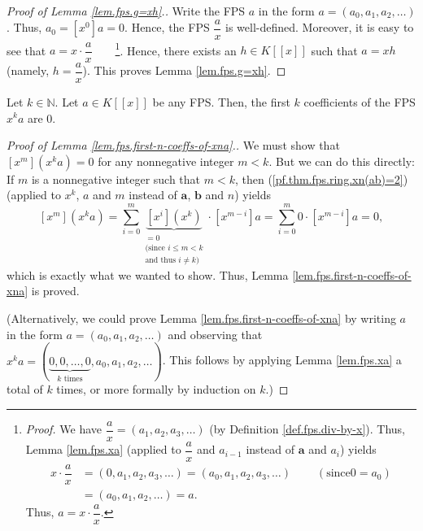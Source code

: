 \begin{proof}
[Proof of Lemma \ref{lem.fps.g=xh}.]Write the FPS $a$ in the form $a=\left(
a_{0},a_{1},a_{2},\ldots\right)  $. Thus, $a_{0}=\left[  x^{0}\right]  a=0$.
Hence, the FPS $\dfrac{a}{x}$ is well-defined. Moreover, it is easy to see
that $a=x\cdot\dfrac{a}{x}$\ \ \ \ \footnote{\textit{Proof.} We have
$\dfrac{a}{x}=\left(  a_{1},a_{2},a_{3},\ldots\right)  $ (by Definition
\ref{def.fps.div-by-x}). Thus, Lemma \ref{lem.fps.xa} (applied to $\dfrac
{a}{x}$ and $a_{i-1}$ instead of $\mathbf{a}$ and $a_{i}$) yields%
\begin{align*}
x\cdot\dfrac{a}{x}  &  =\left(  0,a_{1},a_{2},a_{3},\ldots\right)  =\left(
a_{0},a_{1},a_{2},a_{3},\ldots\right)  \ \ \ \ \ \ \ \ \ \ \left(  \text{since
}0=a_{0}\right) \\
&  =\left(  a_{0},a_{1},a_{2},\ldots\right)  =a.
\end{align*}
Thus, $a=x\cdot\dfrac{a}{x}$.}. Hence, there exists an $h\in K\left[  \left[
x\right]  \right]  $ such that $a=xh$ (namely, $h=\dfrac{a}{x}$). This proves
Lemma \ref{lem.fps.g=xh}.
\end{proof}

\begin{lemma}
\label{lem.fps.first-n-coeffs-of-xna}Let $k\in\mathbb{N}$. Let $a\in K\left[
\left[  x\right]  \right]  $ be any FPS. Then, the first $k$ coefficients of
the FPS $x^{k}a$ are $0$.
\end{lemma}

\begin{proof}
[Proof of Lemma \ref{lem.fps.first-n-coeffs-of-xna}.]We must show that
$\left[  x^{m}\right]  \left(  x^{k}a\right)  =0$ for any nonnegative integer
$m<k$. But we can do this directly: If $m$ is a nonnegative integer such that
$m<k$, then (\ref{pf.thm.fps.ring.xn(ab)=2}) (applied to $x^{k}$, $a$ and $m$
instead of $\mathbf{a}$, $\mathbf{b}$ and $n$) yields%
\[
\left[  x^{m}\right]  \left(  x^{k}a\right)  =\sum_{i=0}^{m}%
\underbrace{\left[  x^{i}\right]  \left(  x^{k}\right)  }%
_{\substack{=0\\\text{(since }i\leq m<k\\\text{and thus }i\neq k\text{)}%
}}\cdot\left[  x^{m-i}\right]  a=\sum_{i=0}^{m}0\cdot\left[  x^{m-i}\right]
a=0,
\]
which is exactly what we wanted to show. Thus, Lemma
\ref{lem.fps.first-n-coeffs-of-xna} is proved.

(Alternatively, we could prove Lemma \ref{lem.fps.first-n-coeffs-of-xna} by
writing $a$ in the form $a=\left(  a_{0},a_{1},a_{2},\ldots\right)  $ and
observing that $x^{k}a=\left(  \underbrace{0,0,\ldots,0}_{k\text{ times}%
},a_{0},a_{1},a_{2},\ldots\right)  $. This follows by applying Lemma
\ref{lem.fps.xa} a total of $k$ times, or more formally by induction on $k$.)
\end{proof}


